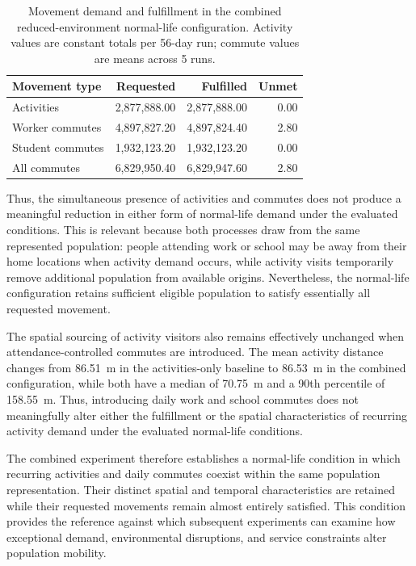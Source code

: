 \begin{table}[ht] 
    \centering 
    \caption{Movement demand and fulfillment in the combined reduced-environment normal-life configuration. Activity values are constant totals per 56-day run; commute values are means across 5 runs.} 
    \label{tbl:routine_mobility_fulfillment_summary} 
    \begin{tabular}{@{}lrrr@{}} 
    \toprule 
    \textbf{Movement type} & \textbf{Requested} & \textbf{Fulfilled} & \textbf{Unmet} \\ \midrule 
    Activities & 2,877,888.00 & 2,877,888.00 & 0.00 \\ 
    Worker commutes & 4,897,827.20 & 4,897,824.40 & 2.80 \\ 
    Student commutes & 1,932,123.20 & 1,932,123.20 & 0.00 \\ 
    All commutes & 6,829,950.40 & 6,829,947.60 & 2.80 \\ \bottomrule 
    \end{tabular}
\end{table}

Thus, the simultaneous presence of activities and commutes does not produce a meaningful reduction in either form of normal-life demand under the evaluated conditions. This is relevant because both processes draw from the same represented population: people attending work or school may be away from their home locations when activity demand occurs, while activity visits temporarily remove additional population from available origins. Nevertheless, the normal-life configuration retains sufficient eligible population to satisfy essentially all requested movement.

The spatial sourcing of activity visitors also remains effectively unchanged when attendance-controlled commutes are introduced. The mean activity distance changes from 86.51~m in the activities-only baseline to 86.53~m in the combined configuration, while both have a median of 70.75~m and a 90th percentile of 158.55~m. Thus, introducing daily work and school commutes does not meaningfully alter either the fulfillment or the spatial characteristics of recurring activity demand under the evaluated normal-life conditions.

The combined experiment therefore establishes a normal-life condition in which recurring activities and daily commutes coexist within the same population representation. Their distinct spatial and temporal characteristics are retained while their requested movements remain almost entirely satisfied. This condition provides the reference against which subsequent experiments can examine how exceptional demand, environmental disruptions, and service constraints alter population mobility.

